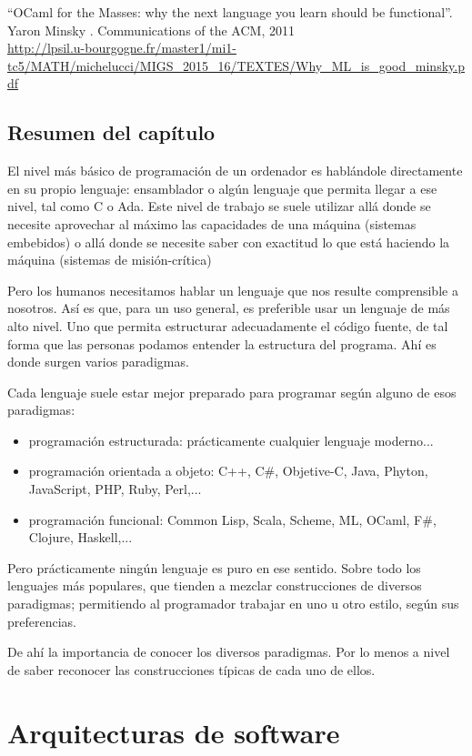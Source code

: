 \documentclass[spanish,12pt,a4paper,final,oneside]{book}
\begin{document}
``OCaml for the Masses: why the next language you learn should be functional''. Yaron Minsky . Communications of the ACM, 2011
\\ \url{http://lpsil.u-bourgogne.fr/master1/mi1-tc5/MATH/michelucci/MIGS_2015_16/TEXTES/Why_ML_is_good_minsky.pdf}


\section*{Resumen del capítulo}
El nivel más básico de programación de un ordenador es hablándole directamente en su propio lenguaje: ensamblador o algún lenguaje que permita llegar a ese nivel, tal como C o Ada. Este nivel de trabajo se suele utilizar allá donde se necesite aprovechar al máximo las capacidades de una máquina (sistemas embebidos) o allá donde se necesite saber con exactitud lo que está haciendo la máquina (sistemas de misión-crítica)

Pero los humanos necesitamos hablar un lenguaje que nos resulte comprensible a nosotros. Así es que, para un uso general, es preferible usar un lenguaje de más alto nivel. Uno que permita estructurar adecuadamente el código fuente, de tal forma que las personas podamos entender la estructura del programa. Ahí es donde surgen varios paradigmas.

Cada lenguaje suele estar mejor preparado para programar según alguno de esos paradigmas:
\begin{itemize}
\item programación estructurada: prácticamente cualquier lenguaje moderno...
\item programación orientada a objeto: C++, C\#, Objetive-C, Java, Phyton, JavaScript, PHP, Ruby, Perl,...
\item programación funcional: Common Lisp, Scala, Scheme, ML, OCaml, F\#, Clojure, Haskell,... 
\end{itemize}

Pero prácticamente ningún lenguaje es puro en ese sentido. Sobre todo los lenguajes más populares, que tienden a mezclar construcciones de diversos paradigmas; permitiendo al programador trabajar en uno u otro estilo, según sus preferencias.

De ahí la importancia de conocer los diversos paradigmas. Por lo menos a nivel de saber reconocer las construcciones típicas de cada uno de ellos.


\chapter{Arquitecturas de software}
\end{document}
